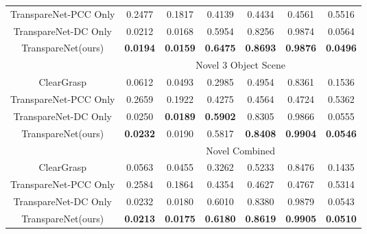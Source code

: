 \documentclass{article}
\newcommand{\algoName}{TranspareNet\xspace}
\begin{document}
\begin{table}[!t]
{\begin{tabular}{c|c|c|c|c|c|c}
	TranspareNet-PCC Only & 0.2477 & 0.1817 & 0.4139 & 0.4434 & 0.4561 & 0.5516 \\
    \rowcolor[HTML]{EFEFEF} 
	TranspareNet-DC Only & 0.0212 & 0.0168 & 0.5954 & 0.8256 & 0.9874 & 0.0564 \\
	\algoName (ours) & \textbf{0.0194} & \textbf{0.0159} & \textbf{0.6475} & \textbf{0.8693} & \textbf{0.9876} & \textbf{0.0496}\\
	\midrule
	\rowcolor[HTML]{FBE0CB}
	$\ $ &  \multicolumn{6}{c}{Novel 3 Object Scene} \\
	\midrule
	\rowcolor[HTML]{EFEFEF} 
	ClearGrasp \citep{ClearGrasp} & 0.0612 & 0.0493 & 0.2985 & 0.4954 & 0.8361 & 0.1536 \\
	TranspareNet-PCC Only & 0.2659 & 0.1922 & 0.4275 & 0.4564 & 0.4724 & 0.5362 \\
	\rowcolor[HTML]{EFEFEF} 
	TranspareNet-DC Only & 0.0250 & \textbf{0.0189} & \textbf{0.5902} & 0.8305 & 0.9866 & 0.0555 \\
	\algoName (ours) & \textbf{0.0232} & 0.0190 & 0.5817 & \textbf{0.8408} & \textbf{0.9904} & \textbf{0.0546}\\
	\midrule
	\rowcolor[HTML]{FBE0CB}
	$\ $ &  \multicolumn{6}{c}{Novel Combined} \\
	\midrule
	\rowcolor[HTML]{EFEFEF} 
	ClearGrasp \citep{ClearGrasp} & 0.0563 & 0.0455 & 0.3262 & 0.5233 & 0.8476 & 0.1435\\
	TranspareNet-PCC Only & 0.2584 & 0.1864 & 0.4354 & 0.4627 & 0.4767 & 0.5314 \\
	\rowcolor[HTML]{EFEFEF} 
	TranspareNet-DC Only & 0.0232 & 0.0180 & 0.6010 & 0.8380 & 0.9879 & 0.0543\\
	\algoName (ours) & \textbf{0.0213} & \textbf{0.0175} & \textbf{0.6180} & \textbf{0.8619} & \textbf{0.9905} & \textbf{0.0510}\\
	\bottomrule
\end{tabular}
}
\label{tab:TODs_Metrics}
\end{table}
\end{document}
